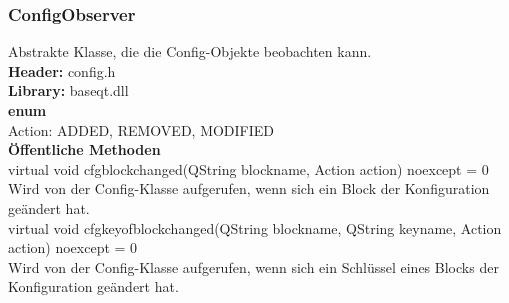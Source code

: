\subsubsection{ConfigObserver}
Abstrakte Klasse, die die Config-Objekte beobachten kann.\bigskip \\
\textbf{Header:} config.h\bigskip \\
\textbf{Library:} baseqt.dll\bigskip \\
\textbf{enum}\\
Action: ADDED, REMOVED, MODIFIED\bigskip \\
\textbf{Öffentliche Methoden}\\
\small{virtual void cfgblockchanged(QString blockname, Action action) noexcept = 0}\\
Wird von der Config-Klasse aufgerufen, wenn sich ein Block der Konfiguration geändert hat.\bigskip \\
\small{virtual void cfgkeyofblockchanged(QString blockname, QString keyname, Action action) noexcept = 0}\\
Wird von der Config-Klasse aufgerufen, wenn sich ein Schlüssel eines Blocks der Konfiguration geändert hat.

